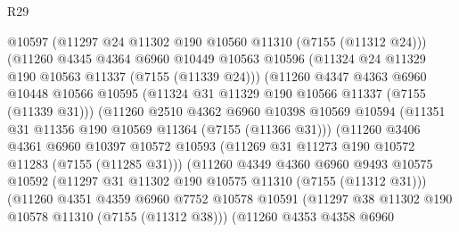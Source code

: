 \begin{lexlean}{R29}
\begin{coremodule}
                            @10597
                            (@11297 @24 @11302 @190 @10560 @11310 (@7155 (@11312 @24)))
                            (@11260
                              @4345
                              @4364
                              @6960
                              @10449
                              @10563
                              @10596
                              (@11324 @24 @11329 @190 @10563 @11337 (@7155 (@11339 @24)))
                              (@11260
                                @4347
                                @4363
                                @6960
                                @10448
                                @10566
                                @10595
                                (@11324 @31 @11329 @190 @10566 @11337 (@7155 (@11339 @31)))
                                (@11260
                                  @2510
                                  @4362
                                  @6960
                                  @10398
                                  @10569
                                  @10594
                                  (@11351 @31 @11356 @190 @10569 @11364 (@7155 (@11366 @31)))
                                  (@11260
                                    @3406
                                    @4361
                                    @6960
                                    @10397
                                    @10572
                                    @10593
                                    (@11269 @31 @11273 @190 @10572 @11283 (@7155 (@11285 @31)))
                                    (@11260
                                      @4349
                                      @4360
                                      @6960
                                      @9493
                                      @10575
                                      @10592
                                      (@11297 @31 @11302 @190 @10575 @11310 (@7155 (@11312 @31)))
                                      (@11260
                                        @4351
                                        @4359
                                        @6960
                                        @7752
                                        @10578
                                        @10591
                                        (@11297 @38 @11302 @190 @10578 @11310 (@7155 (@11312 @38)))
                                        (@11260
                                          @4353
                                          @4358
                                          @6960

\end{coremodule}
\end{lexlean}
